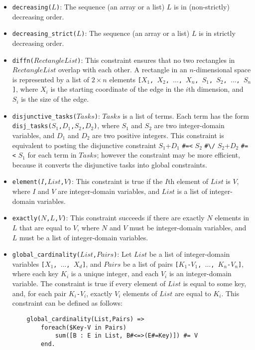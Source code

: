 \begin{itemize}
\item \texttt{decreasing($L$)}: The sequence (an array or a list) $L$ is in (non-strictly) decreasing order.

\item \texttt{decreasing\_strict($L$)}: The sequence (an array or a list) $L$ is in strictly decreasing order.

\item \texttt{diffn($RectangleList$)}: This constraint ensures that no two rectangles in $RectangleList$ overlap with each other. A rectangle in an $n$-dimensional space is represented by a list of $2\times n$ elements \texttt{[$X_1$, $X_2$, $\ldots$, $X_n$, $S_1$, $S_2$, $\ldots$, $S_n$]}, where \texttt{$X_i$} is the starting coordinate of the edge in the $i$th dimension, and \texttt{$S_i$} is the size of the edge.

\item \texttt{disjunctive\_tasks($Tasks$)}: $Tasks$ is a list of terms.  Each term has the form \\ \texttt{disj\_tasks($S_1$,$D_1$,$S_2$,$D_2$)}, where \texttt{$S_1$} and \texttt{$S_2$} are two integer-domain variables, and \texttt{$D_1$} and \texttt{$D_2$} are two positive integers. This constraint is equivalent to posting the disjunctive constraint $S_1$+$D_1$ \verb+#=<+ $S_2$ \verb+#\/+ $S_2$+$D_2$ \verb+#=<+ $S_1$ for each term in $Tasks$; however the constraint may be more efficient, because it converts the disjunctive tasks into global constraints. 

\item \texttt{element($I$,$List$,$V$)}: This constraint is true if the $I$th element of $List$ is $V$, where $I$ and $V$ are integer-domain variables, and $List$ is a list of integer-domain variables.

\item \texttt{exactly($N$,$L$,$V$)}: This constraint succeeds if there are exactly $N$ elements in $L$ that are equal to $V$, where $N$ and $V$ must be integer-domain variables, and $L$ must be a list of integer-domain variables.

\item \texttt{global\_cardinality($List$,$Pairs$)}: Let $List$ be a list of integer-domain variables \texttt{[$X_1$, $\ldots$, $X_d$]}, and $Pairs$ be a list of pairs \texttt{[$K_1$-$V_1$, $\ldots$, $K_n$-$V_n$]}, where each key \texttt{$K_i$} is a unique integer, and each \texttt{$V_i$} is an integer-domain variable. The constraint is true if every element of $List$ is equal to some key, and, for each pair \texttt{$K_i$-$V_i$}, exactly \texttt{$V_i$} elements of $List$ are equal to \texttt{$K_i$}. This constraint can be defined as follows:
\begin{verbatim}
    global_cardinality(List,Pairs) =>
        foreach($Key-V in Pairs) 
            sum([B : E in List, B#<=>(E#=Key)]) #= V
        end.
\end{verbatim}


\end{itemize}
